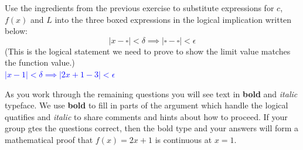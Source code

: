 \documentclass{ximera}
\begin{document}
\begin{exercise}
    Use the ingredients from the previous exercise to substitute expressions for $c$, $f(x)$ and $L$ into the three boxed expressions in the logical implication written below:
    \[|x-\square|<\delta \implies |\square-\square|<\epsilon \]
    (This is the logical statement we need to prove to show the limit value matches the function value.)\\
    \textcolor{blue}{$|x-1|<\delta \implies |2x+1-3|<\epsilon $}
\end{exercise}


As you work through the remaining questions you will see text in \textbf{bold} and \textit{italic} typeface.  We use \textbf{bold} to fill in parts of the argument which handle the logical quatifies and \textit{italic} to share comments and hints about how to proceed.  If your group gtes the questions correct, then the bold type and your answers will form a mathematical proof that $f(x)=2x+1$ is continuous at $x=1$.
\end{document}
